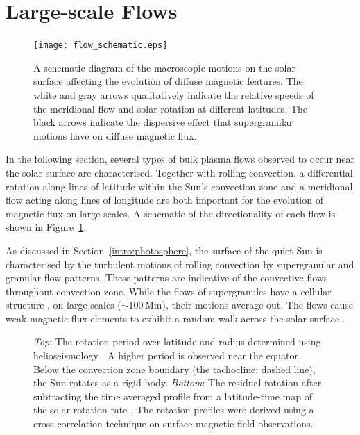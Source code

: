 \section{Large-scale Flows}\label{intro:largeflows}

 \begin{figure}[!t]    %
   \centerline{\texttt{[image: flow\_schematic.eps]}
              }
              \caption[A schematic diagram of the macroscopic motions on the solar surface.]{A schematic diagram of the macroscopic motions on the solar surface affecting the evolution of diffuse magnetic features. The white and gray arrows qualitatively indicate the relative speeds of the meridional flow and solar rotation at different latitudes. The black arrows indicate the dispersive effect that supergranular motions have on diffuse magnetic flux.}
   \label{fig:flowschem}
   \end{figure}

In the following section, several types of bulk plasma flows observed to occur near the solar surface are characterised. Together with rolling convection, a differential rotation along lines of latitude within the Sun's convection zone and a meridional flow acting along lines of longitude are both important for the evolution of magnetic flux on large scales. A schematic of the directionality of each flow is shown in Figure~\ref{fig:flowschem}.

As discussed in Section~\ref{intro:photosphere}, the surface of the quiet Sun is characterised by the turbulent motions of rolling convection by supergranular and granular flow patterns.  These patterns are indicative of the convective flows throughout convection zone. While the flows of supergranules have a cellular structure \citep{Schrijver:1997a}, on large scales ($\sim$100\,Mm), their motions average out. The  flows cause weak magnetic flux elements to exhibit a random walk across the solar surface \citep{Wang:1988}.

\begin{figure}%
\caption[The solar differential rotation.]{\emph{Top}: The rotation period over latitude and radius determined using helioseismology \citep[from][]{Schou:1998}. A higher period is observed near the equator. Below the convection zone boundary (the tachocline; dashed line), the Sun rotates as a rigid body. \emph{Bottom}: The residual rotation after subtracting the time averaged profile from a latitude-time map of the solar rotation rate \citep[from][]{Hathaway:2011}. The rotation profiles were derived using a cross-correlation technique on surface magnetic field observations.}
\label{fig:diffrotprofile}
\end{figure}

